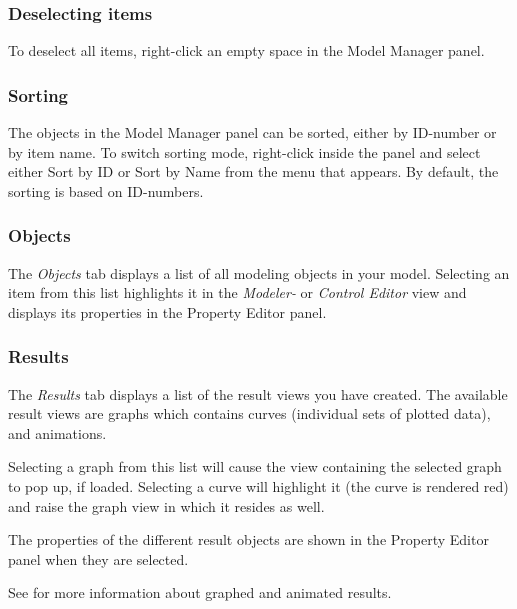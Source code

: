 \subsubsection{Deselecting items}

To deselect all items, right-click an empty space in the Model Manager panel.

\subsubsection{Sorting}

The objects in the Model Manager panel can be sorted, either by ID-number or
by item name. To switch sorting mode, right-click inside the panel and
select either Sort by ID or Sort by Name from the menu that appears.
By default, the sorting is based on ID-numbers.


\subsubsection{Objects}

The {\sl Objects} tab displays a list of all modeling objects in your
model. Selecting an item from this list highlights it in the
{\sl Modeler-} or {\sl Control Editor} view and displays its
properties in the Property Editor panel.

\subsubsection{Results}

The {\sl Results} tab displays a list of the result views you have
created. The available result views are graphs which contains curves
(individual sets of plotted data), and animations.

Selecting a graph from this list will cause the view containing the
selected graph to pop up, if loaded. Selecting a curve will highlight it
(the curve is rendered red) and raise the graph view in which it resides
as well.

The properties of the different result objects are shown in the
Property Editor panel when they are selected.

See 
for more information about graphed and animated results.


